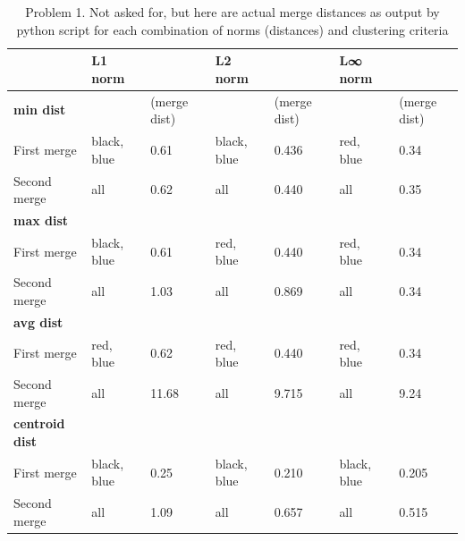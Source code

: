 \documentclass[submit]{harvardml}
\newenvironment{answer}{%
\color{answergreen}\sffamily\large}{}
\begin{document}
\begin{enumerate}
\begin{answer}
\begin{table}
\begin{adjustbox}{max width=\textwidth}
				\begin{tabular}{@{}l|ll|ll|ll@{}}
					& \textbf{L1 norm} &              & \textbf{L2 norm} &              & \textbf{L∞ norm} &              \\ \midrule
					\textbf{min dist}      &                  & (merge dist) &                  & (merge dist) &                  & (merge dist) \\
					First merge            & black, blue      & 0.61         & black, blue      & 0.436        & red, blue        & 0.34         \\
					Second merge           & all              & 0.62         & all              & 0.440        & all              & 0.35         \\ \midrule
					\textbf{max dist}      &                  &              &                  &              &                  &              \\
					First merge            & black, blue      & 0.61         & red, blue        & 0.440        & red, blue        & 0.34         \\
					Second merge           & all              & 1.03         & all              & 0.869        & all              & 0.34         \\ \midrule
					\textbf{avg dist}      &                  &              &                  &              &                  &              \\
					First merge            & red, blue        & 0.62         & red, blue        & 0.440        & red, blue        & 0.34         \\
					Second merge           & all              & 11.68        & all              & 9.715        & all              & 9.24         \\ \midrule
					\textbf{centroid dist} &                  &              &                  &              &                  &              \\
					First merge            & black, blue      & 0.25         & black, blue      & 0.210        & black, blue      & 0.205        \\
					Second merge           & all              & 1.09         & all              & 0.657        & all              & 0.515       
				\end{tabular}
\end{adjustbox}
			\caption{Problem 1. Not asked for, but here are actual merge distances as output by python script for each combination of norms (distances) and clustering criteria}
			\label{p1 dendo dist}
		\end{table}
        \end{answer}

\end{enumerate}
\end{document}
